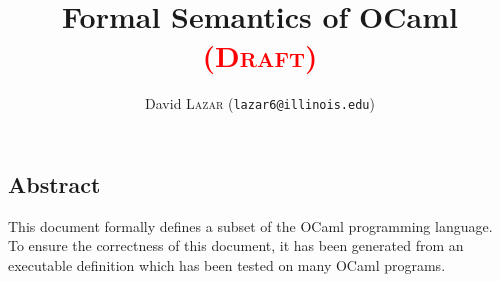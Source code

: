 \setlength{\parindent}{1em}
\title{Formal Semantics of OCaml \textcolor{red}{\textsc{(Draft)}}}
\author{David \textsc{Lazar} (\texttt{lazar6@illinois.edu})}

\maketitle

\begin{kblock}[text]
\section{Abstract}
This document formally defines a subset of the OCaml programming language.
To ensure the correctness of this document, it has been generated from an executable \K definition which has been tested on many OCaml programs.
\end{kblock}
